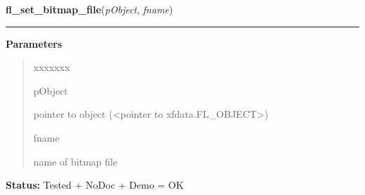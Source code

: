     \vspace{0.5ex}

\hspace{.8\funcindent}\begin{boxedminipage}{\funcwidth}

    \raggedright \textbf{fl\_set\_bitmap\_file}(\textit{pObject}, \textit{fname})

    \vspace{-1.5ex}

    \rule{\textwidth}{0.5\fboxrule}
\setlength{\parskip}{2ex}
\setlength{\parskip}{1ex}
      \textbf{Parameters}
      \vspace{-1ex}

      \begin{quote}
        \begin{Ventry}{xxxxxxx}

          \item[pObject]

          pointer to object ({\textless}pointer to 
          xfdata.FL\_OBJECT{\textgreater})

          \item[fname]

          name of bitmap file

        \end{Ventry}

      \end{quote}

\textbf{Status:} Tested + NoDoc + Demo = OK



    \end{boxedminipage}

    \label{xformslib:library:fl_set_bitmap_file}

    \vspace{0.5ex}

